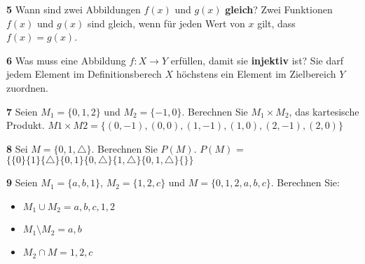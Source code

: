 \documentclass[11pt]{article}
\begin{document}
    \textbf{5} Wann sind zwei Abbildungen $f(x)$ und $g(x)$ \textbf{gleich}?\newline
    Zwei Funktionen $f(x)$ und $g(x)$ sind gleich, wenn für jeden Wert von $x$ gilt, dass $f(x) = g(x)$.\newline

    \textbf{6} Was muss eine Abbildung $f : X \rightarrow Y $ erfüllen, damit sie \textbf{injektiv} ist?\newline
    Sie darf jedem Element im Definitionsberech $X$ höchstens ein Element im Zielbereich $Y$ zuordnen.\newline

    \textbf{7} Seien \( M_1 = \{0,1,2\} \) und \( M_2 = \{-1, 0\} \). Berechnen Sie \( M_1 \times M_2 \), das kartesische Produkt.\newline
    $M1 \times M2 = \{(0,-1),(0,0),(1,-1),(1,0),(2,-1),(2,0)\}$ \newline

    \textbf{8} Sei \( M = \{0, 1, \triangle\} \). Berechnen Sie \( P(M) \).\newline
    \( P(M) \) = $\{\{0\}\{1\}\{\triangle\}\{0,1\}\{0,\triangle\}\{1,\triangle\}\{0,1,\triangle\}\{\}\}$\newline

    \textbf{9} Seien \( M_1 = \{a, b, 1\} \), \( M_2 = \{1, 2, c\} \) und \( M = \{0, 1, 2, a, b, c\} \). Berechnen Sie:
    \begin{itemize}
        \item \( M_1 \cup M_2 = {a,b,c,1,2}\)
        \item \( M_1 \setminus M_2 = {a,b}\)
        \item \( M_2 \cap M = {1,2,c}\)
    \end{itemize}\newline
\end{document}
